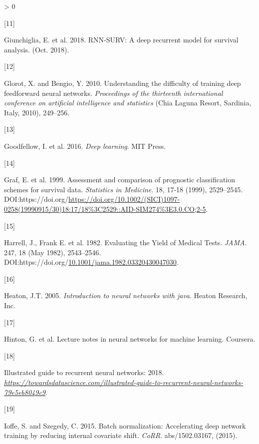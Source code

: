 \documentclass[
]{article}
\newlength{\cslhangindent}
\newlength{\csllabelwidth}
\newenvironment{CSLReferences}[2] %
 {%
  \setlength{\parindent}{0pt}
  \ifodd #1 \everypar{\setlength{\hangindent}{\cslhangindent}}\ignorespaces\fi
  \ifnum #2 > 0
  \setlength{\parskip}{#2\baselineskip}
  \fi
 }%
 {}
\newcommand{\CSLLeftMargin}[1]{\parbox[t]{\csllabelwidth}{#1}}
\newcommand{\CSLRightInline}[1]{\parbox[t]{\linewidth - \csllabelwidth}{#1}\break}
\begin{document}
\begin{CSLReferences}{0}{0}
\leavevmode\hypertarget{ref-rnn-surv}{}%
\CSLLeftMargin{{[}11{]} }
\CSLRightInline{Giunchiglia, E. et al. 2018. RNN-SURV: A deep recurrent model for survival analysis. (Oct. 2018).}

\leavevmode\hypertarget{ref-xavier-init}{}%
\CSLLeftMargin{{[}12{]} }
\CSLRightInline{Glorot, X. and Bengio, Y. 2010. Understanding the difficulty of training deep feedforward neural networks. \emph{Proceedings of the thirteenth international conference on artificial intelligence and statistics} (Chia Laguna Resort, Sardinia, Italy, 2010), 249--256.}

\leavevmode\hypertarget{ref-Goodfellow-et-al-2016}{}%
\CSLLeftMargin{{[}13{]} }
\CSLRightInline{Goodfellow, I. et al. 2016. \emph{Deep learning}. MIT Press.}

\leavevmode\hypertarget{ref-ibs}{}%
\CSLLeftMargin{{[}14{]} }
\CSLRightInline{Graf, E. et al. 1999. Assessment and comparison of prognostic classification schemes for survival data. \emph{Statistics in Medicine}. 18, 17‐18 (1999), 2529--2545. DOI:https://doi.org/\url{https://doi.org/10.1002/(SICI)1097-0258(19990915/30)18:17/18\%3C2529::AID-SIM274\%3E3.0.CO;2-5}.}

\leavevmode\hypertarget{ref-c-idx}{}%
\CSLLeftMargin{{[}15{]} }
\CSLRightInline{Harrell, J., Frank E. et al. 1982. {Evaluating the Yield of Medical Tests}. \emph{JAMA}. 247, 18 (May 1982), 2543--2546. DOI:https://doi.org/\href{https://doi.org/10.1001/jama.1982.03320430047030}{10.1001/jama.1982.03320430047030}.}

\leavevmode\hypertarget{ref-heaton2005neural}{}%
\CSLLeftMargin{{[}16{]} }
\CSLRightInline{Heaton, J.T. 2005. \emph{Introduction to neural networks with java}. Heaton Research, Inc.}

\leavevmode\hypertarget{ref-bag-of-tricks}{}%
\CSLLeftMargin{{[}17{]} }
\CSLRightInline{Hinton, G. et al. Lecture notes in neural networks for machine learning. Coursera.}

\leavevmode\hypertarget{ref-rnn-towards-ds}{}%
\CSLLeftMargin{{[}18{]} }
\CSLRightInline{Illustrated guide to recurrent neural networks: 2018. \emph{\url{https://towardsdatascience.com/illustrated-guide-to-recurrent-neural-networks-79e5eb8049c9}}.}

\leavevmode\hypertarget{ref-batch-normalization}{}%
\CSLLeftMargin{{[}19{]} }
\CSLRightInline{Ioffe, S. and Szegedy, C. 2015. Batch normalization: Accelerating deep network training by reducing internal covariate shift. \emph{CoRR}. abs/1502.03167, (2015).}


\end{CSLReferences}
\end{document}
